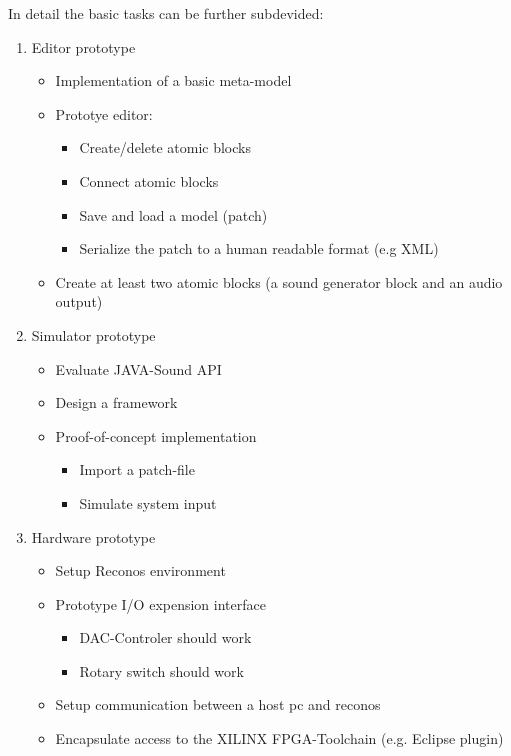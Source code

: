 In detail the basic tasks can be further subdevided:

\begin{enumerate}
	\item Editor prototype
		\begin{itemize}
			\item Implementation of a basic meta-model
			\item Prototye editor:
				\begin{itemize}
					\item Create/delete atomic blocks
					\item Connect atomic blocks
					\item Save and load a model (patch)
					\item Serialize the patch to a human readable format (e.g XML)
				\end{itemize}
			\item Create at least two atomic blocks (a sound generator block and an audio output)
		\end{itemize}
	\item Simulator prototype
		\begin{itemize}
			\item Evaluate JAVA-Sound API
			\item Design a framework
			\item Proof-of-concept implementation
			\begin{itemize}
				\item Import a patch-file
				\item Simulate system input
			\end{itemize}
		\end{itemize}
	\item Hardware prototype
		\begin{itemize}
			\item Setup Reconos environment
			\item Prototype I/O expension interface
			\begin{itemize}
				\item DAC-Controler should work
				\item Rotary switch should work
			\end{itemize}
			\item Setup communication between a host pc and reconos
			\item Encapsulate access to the XILINX FPGA-Toolchain (e.g. Eclipse plugin)
		\end{itemize}
\end{enumerate}


